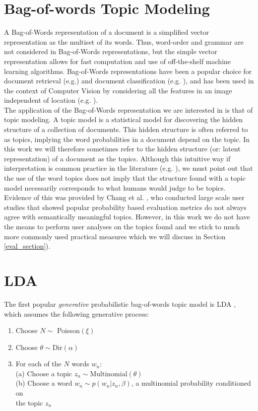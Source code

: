 \documentclass{report}
\begin{document}
\section{Bag-of-words Topic Modeling}\label{topmod}
A Bag-of-Words representation of a document is a simplified vector representation as the multiset of its words. Thus, word-order and grammar are not considered in Bag-of-Words representations, but the simple vector representation allows for fast computation and use of off-the-shelf machine learning algorithms. Bag-of-Words representations have been a popular choice for document retrieval (e.g.\cite{landauer1990fully}) and document classification (e.g. \cite{li1998classification}), and has been used in the context of Computer Vision by considering all the features in an image independent of location (e.g. \cite{fei2005bayesian}). \\
The application of the Bag-of-Words representation we are interested in is that of topic modeling. A topic model is a statistical model for discovering the hidden structure of a collection of documents. This hidden structure is often referred to as topics, implying the word probabilities in a document depend on the topic. In this work we will therefore sometimes refer to the hidden structure (or: latent representation) of a document as the topics. Although this intuitive way if interpretation is common practice in the literature (e.g. \cite{blei2003latent}), we must point out that the use of the word topics does not imply that the structure found with a topic model necessarily corresponds to what humans would judge to be topics. Evidence of this was provided by Chang et al. \cite{chang2009reading}, who conducted large scale user studies that showed popular probability based evaluation metrics do not always agree with semantically meaningful topics. However, in this work we do not have the means to perform user analyses on the topics found and we stick to much more commonly used practical measures which we will discuss in Section \ref{eval_section}).

\section{LDA}\label{LDA}
The first popular \textit{generative} probabilistic bag-of-words topic model is LDA \cite{blei2003latent}, which assumes the following generative process:

\begin{enumerate}\label{lda_algo}\itemsep3pt
	\item{Choose $N \sim$ Poisson$(\xi)$}
	\item{Choose $\theta \sim \text{Dir}(\alpha)$}
	\item{For each of the $N$ words $w_n$:\\ 
		\tabto{1.5cm} (a) Choose a topic $z_n \sim \text{Multinomial}(\theta)$\\
		\tabto{1.5cm} (b) Choose a word  $w_n \sim p(w_n|z_n,\beta)$, a multinomial probability conditioned on \\ \tabto{2.23cm}the topic $z_n$}
\end{enumerate}
\end{document}
